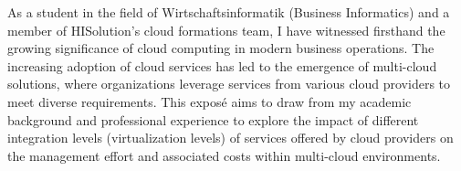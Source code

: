\label{sec:einführung}
As a student in the field of Wirtschaftsinformatik (Business Informatics) and a member of HISolution's cloud formations team, 
I have witnessed firsthand the growing significance of cloud computing in modern business operations. 
The increasing adoption of cloud services has led to the emergence of multi-cloud solutions, 
where organizations leverage services from various cloud providers to meet diverse requirements. 
This exposé aims to draw from my academic background 
and professional experience to explore the impact of different integration levels (virtualization levels) of services offered by cloud providers 
on the management effort and associated costs within multi-cloud environments.




